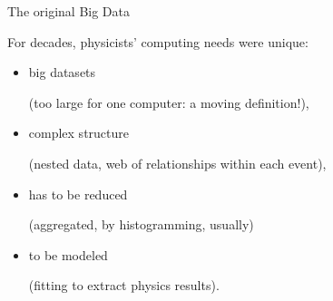 \documentclass[aspectratio=169]{beamer}
\begin{document}
\begin{frame}{The original Big Data}
\vspace{0.5 cm}

\large For decades, physicists' computing needs were unique:

\vspace{0.1 cm}
\begin{itemize}
\item big datasets \hfill \begin{minipage}{0.7\linewidth}(too large for one computer: a moving definition!),\end{minipage}
\item complex structure \hfill \begin{minipage}{0.7\linewidth}(nested data, web of relationships within each event),\end{minipage}
\item has to be reduced \hfill \begin{minipage}{0.7\linewidth}(aggregated, by histogramming, usually)\end{minipage}
\item to be modeled \hfill \begin{minipage}{0.7\linewidth}(fitting to extract physics results).\end{minipage}
\end{itemize}

\vspace{0.5 cm}
\end{frame}
\end{document}
